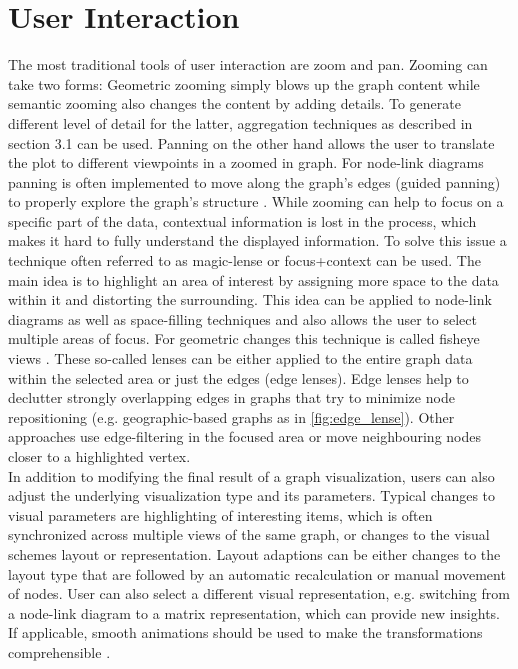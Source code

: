 \section{User Interaction}
The most traditional tools of user interaction are zoom and pan. Zooming can take two forms: Geometric zooming simply blows up the graph content while semantic zooming also changes the content by adding details\cite{Herman2000}. To generate different level of detail for the latter, aggregation techniques as described in section 3.1 can be used. Panning on the other hand allows the user to translate the plot to different viewpoints in a zoomed in graph. For node-link diagrams panning is often implemented to move along the graph's edges (guided panning) to properly explore the graph's structure \cite{VonLandesberger2011}.
While zooming can help to focus on a specific part of the data, contextual information is lost in the process, which makes it hard to fully understand the displayed information. To solve this issue a technique often referred to as magic-lense \cite{VonLandesberger2011} or focus+context \cite{Herman2000} can be used. The main idea is to highlight an area of interest by assigning more space to the data within it and distorting the surrounding. This idea can be applied to node-link diagrams as well as space-filling techniques and also allows the user to select multiple areas of focus. For geometric changes this technique is called fisheye views \cite{VonLandesberger2011}. These so-called lenses can be either applied to the entire graph data within the selected area or just the edges (edge lenses). Edge lenses help to declutter strongly overlapping edges in graphs that try to minimize node repositioning (e.g. geographic-based graphs as in \autoref{fig:edge_lense}). Other approaches use edge-filtering in the focused area or move neighbouring nodes closer to a highlighted vertex.\\
In addition to modifying the final result of a graph visualization, users can also adjust the underlying visualization type and its parameters. Typical changes to visual parameters are highlighting of interesting items, which is often synchronized across multiple views of the same graph, or changes to the visual schemes layout or representation. Layout adaptions can be either changes to the layout type that are followed by an automatic recalculation or manual movement of nodes. User can also select a different visual representation, e.g. switching from a node-link diagram to a matrix representation, which can provide new insights. If applicable, smooth animations should be used to make the transformations comprehensible \cite{VonLandesberger2011}.


